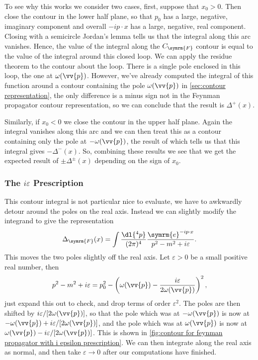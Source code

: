 \documentclass[fleqn]{NotesClass}
\newcommand{\e}{\symrm{e}}
\newcommand{\feynman}{\symrm{F}}
\begin{document}
    To see why this works we consider two cases, first, suppose that \(x_0 > 0\).
    Then close the contour in the lower half plane, so that \(p_0\) has a large, negative, imaginary component and overall \(-ip\cdot x\) has a large, negative, real component.
    Closing with a semicircle Jordan's lemma tells us that the integral along this arc vanishes.
    Hence, the value of the integral along the \(C_{\feynman}\) contour is equal to the value of the integral around this closed loop.
    We can apply the residue theorem to the contour about the loop.
    There is a single pole enclosed in this loop, the one at \(\omega(\vv{p})\).
    However, we've already computed the integral of this function around a contour containing the pole \(\omega(\vv{p})\) in \cref{sec:contour representation}, the only difference is a minus sign not in the Feynman propagator contour representation, so we can conclude that the result is \(\Delta^+(x)\).
    
    Similarly, if \(x_0 < 0\) we close the contour in the upper half plane.
    Again the integral vanishes along this arc and we can then treat this as a contour containing only the pole at \(-\omega(\vv{p})\), the result of which tells us that this integral gives \(-\Delta^-(x)\).
    So, combining these results we see that we get the expected result of \(\pm \Delta^{\pm}(x)\) depending on the sign of \(x_0\).
    
    \subsubsection{The \texorpdfstring{\(i\varepsilon\)}{i epsilon} Prescription}
    This contour integral is not particular nice to evaluate, we have to awkwardly detour around the poles on the real axis.
    Instead we can slightly modify the integrand to give the representation
    \begin{equation}
        \Delta_{\feynman}(x) = \int \frac{\dl{^4p}}{(2\pi)^4} \frac{\e^{-ip\cdot x}}{p^2 - m^2 + i\varepsilon}.
    \end{equation}
    This moves the two poles slightly off the real axis.
    Let \(\varepsilon > 0\) be a small positive real number, then
    \begin{equation}
        p^2 - m^2 + i\varepsilon = p_0^2 - \left( \omega(\vv{p}) - \frac{i\varepsilon}{2\omega(\vv{p})} \right)^2,
    \end{equation}
    just expand this out to check, and drop terms of order \(\varepsilon^2\).
    The poles are then shifted by \(i\varepsilon/[2\omega(\vv{p})]\), so that the pole which was at \(-\omega(\vv{p})\) is now at \(-\omega(\vv{p}) + i\varepsilon/[2\omega(\vv{p})]\), and the pole which was at \(\omega(\vv{p})\) is now at \(\omega(\vv{p}) - i\varepsilon/[2\omega(\vv{p})]\).
    This is shown in \cref{fig:contour for feynman propagator with i epsilon prescription}.
    We can then integrate along the real axis as normal, and then take \(\varepsilon \to 0\) after our computations have finished.
    
\end{document}
